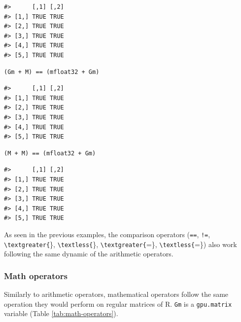 \begin{verbatim}
#>      [,1] [,2]
#> [1,] TRUE TRUE
#> [2,] TRUE TRUE
#> [3,] TRUE TRUE
#> [4,] TRUE TRUE
#> [5,] TRUE TRUE
\end{verbatim}

\begin{verbatim}
(Gm + M) == (mfloat32 + Gm)
\end{verbatim}

\begin{verbatim}
#>      [,1] [,2]
#> [1,] TRUE TRUE
#> [2,] TRUE TRUE
#> [3,] TRUE TRUE
#> [4,] TRUE TRUE
#> [5,] TRUE TRUE
\end{verbatim}

\begin{verbatim}
(M + M) == (mfloat32 + Gm)
\end{verbatim}

\begin{verbatim}
#>      [,1] [,2]
#> [1,] TRUE TRUE
#> [2,] TRUE TRUE
#> [3,] TRUE TRUE
#> [4,] TRUE TRUE
#> [5,] TRUE TRUE
\end{verbatim}

As seen in the previous examples, the comparison operators (\texttt{==}, \texttt{!=}, \texttt{\textbackslash{}textgreater\{}\}, \texttt{\textbackslash{}textless\{}\}, \texttt{\textbackslash{}textgreater\{}=\}, \texttt{\textbackslash{}textless\{}=\}) also work following the same dynamic of the arithmetic operators.

\hypertarget{math-operators}{%
\subsubsection{Math operators}\label{math-operators}}

Similarly to arithmetic operators, mathematical operators follow the same operation they would perform on regular matrices of R. \texttt{Gm} is a \texttt{gpu.matrix} variable (Table \ref{tab:math-operators}).

